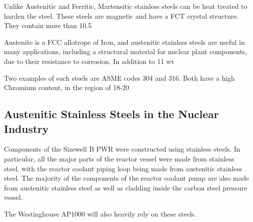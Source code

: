 





Unlike Austenitic and Ferritic, Martensitic stainless steels can be heat treated to harden the steel.  These steels are magnetic and have a FCT crystal structure.  They contain more than 10.5%









Austenite is a FCC allotrope of Iron, and austenitic stainless steels are useful in many applications, including a structural material for nuclear plant components, due to their resistance to corrosion.  In addition to 11 wt%

Two examples of such steels are ASME codes 304 and 316.  Both have a high Chromium content, in the region of 18-20%



\subsection{Austenitic Stainless Steels in the Nuclear Industry}

Components of the Sizewell B PWR were constructed using stainless steels.  In particular, all the major parts of the reactor vessel were made from stainless steel, with the reactor coolant piping loop being made from austenitic stainless steel.  The majority of the components of the reactor coolant pump are also made from austenitic stainless steel as well as cladding inside the carbon steel pressure vessel. \cite{sizewellbdescription}

\cite{eprreactoroverview}

The Westinghouse AP1000 will also heavily rely on these steels.
\cite{ap1000preconstruction}

